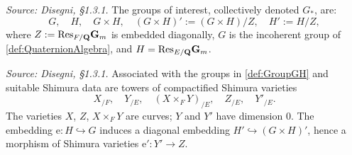 \begin{definition}
  \label{def:GroupGH}
  \textit{Source: Disegni, §1.3.1.}
  The groups of interest, collectively denoted $G_*$, are:
  \[
    G, \quad H, \quad G \times H, \quad (G \times H)' := (G \times H)/Z,
    \quad H' := H/Z,
  \]
  where $Z := \mathrm{Res}_{F/\mathbf{Q}}\mathbf{G}_m$ is embedded diagonally, $G$
  is the incoherent group of \cref{def:QuaternionAlgebra}, and
  $H = \mathrm{Res}_{E/\mathbf{Q}}\mathbf{G}_m$.
\end{definition}

\begin{definition}
  \label{def:ShimuraVarieties}
  \textit{Source: Disegni, §1.3.1.}
  Associated with the groups in \cref{def:GroupGH} and suitable Shimura
  data are towers of compactified Shimura varieties
  \[
    X_{/F},\quad Y_{/E},\quad (X \times_F Y)_{/E},\quad Z_{/E},\quad Y'_{/E}.
  \]
  The varieties $X$, $Z$, $X \times_F Y$ are curves; $Y$ and $Y'$ have
  dimension $0$.  The embedding $\mathrm{e} \colon H \hookrightarrow G$
  induces a diagonal embedding $H' \hookrightarrow (G \times H)'$, hence
  a morphism of Shimura varieties $\mathrm{e}' \colon Y' \to Z$.
\end{definition}

